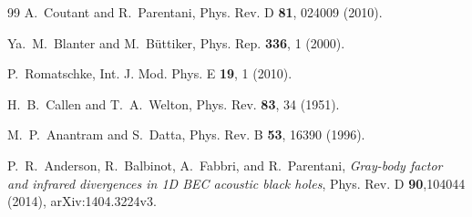 \documentclass[aps,prd,twocolumn,showpacs,superscriptaddress,nofootinbib]{revtex4-2}
\begin{document}
\begin{thebibliography}{99}
 A.~Coutant and R.~Parentani, Phys. Rev. D \textbf{81}, 024009 (2010).

 Ya.~M.~Blanter and M.~B\"uttiker, Phys. Rep. \textbf{336}, 1 (2000).

 P.~Romatschke, Int. J. Mod. Phys. E \textbf{19}, 1 (2010).

 H.~B.~Callen and T.~A.~Welton, Phys. Rev. \textbf{83}, 34 (1951).

 M.~P.~Anantram and S.~Datta, Phys. Rev. B \textbf{53}, 16390 (1996).

 P.~R.~Anderson, R.~Balbinot, A.~Fabbri, and R.~Parentani,
\emph{Gray-body factor and infrared divergences in 1D BEC acoustic black holes},
Phys. Rev. D \textbf{90},104044 (2014), arXiv:1404.3224v3.

\end{thebibliography}
\end{document}
